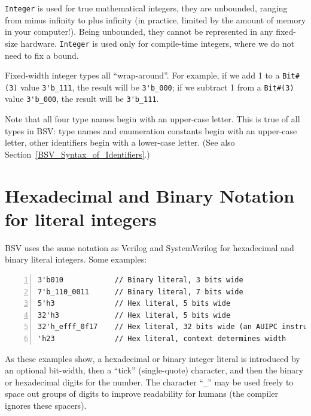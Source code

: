 \verb|Integer| is used for true mathematical integers, {\ie} they are
unbounded, ranging from minus infinity to plus infinity (in practice,
limited by the amount of memory in your computer!).  Being unbounded,
they cannot be represented in any fixed-size hardware.  \verb|Integer|
is used only for compile-time integers, where we do not need to fix a
bound.


Fixed-width integer types all ``wrap-around''.  For example, if we add
1 to a \verb|Bit#(3)| value \verb|3'b_111|, the result will be
\verb|3'b_000|; if we subtract 1 from a \verb|Bit#(3)| value
\verb|3'b_000|, the result will be \verb|3'b_111|.

Note that all four type names begin with an upper-case letter.  This
is true of all types in BSV: type names and enumeration constants
begin with an upper-case letter, other identifiers begin with a
lower-case letter.  (See also
Section~\ref{BSV_Syntax_of_Identifiers}.)


\section{Hexadecimal and Binary Notation for literal integers}

\label{BSV_hex_bin_literals}


BSV uses the same notation as Verilog and SystemVerilog for
hexadecimal and binary literal integers.  Some examples:

{\small
\begin{Verbatim}[frame=single, numbers=left]
3'b010            // Binary literal, 3 bits wide
7'b_110_0011      // Binary literal, 7 bits wide
5'h3              // Hex literal, 5 bits wide
32'h3             // Hex literal, 5 bits wide
32'h_efff_0f17    // Hex literal, 32 bits wide (an AUIPC instruction)
'h23              // Hex literal, context determines width
\end{Verbatim}
}

As these examples show, a hexadecimal or binary integer literal is
introduced by an optional bit-width, then a ``tick'' (single-quote)
character, and then the binary or hexadecimal digits for the number.
The character ``{\verb|_|}'' may be used freely to space out groups of
digits to improve readability for humans (the compiler ignores these
spacers).

